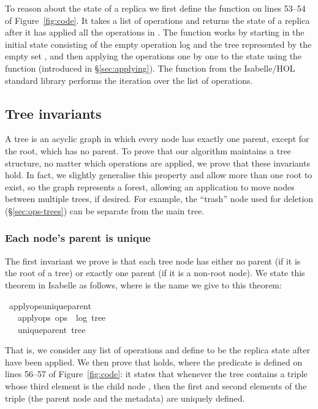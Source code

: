 \documentclass[sigplan,anonymous]{acmart}
\renewenvironment{isabelle}{%
  \medbreak\noindent%
  \renewcommand{\isanewline}{\\}%
  \begin{minipage}{\columnwidth}%
  \begin{isabellebody}%
  \begin{tabbing}%
}{%
  \end{tabbing}%
  \end{isabellebody}%
  \end{minipage}%
  \medbreak%
}
\renewcommand{\isacartoucheopen}{}
\renewcommand{\isacartoucheclose}{}
\begin{document}
To reason about the state of a replica we first define the function  on lines 53--54 of Figure~\ref{fig:code}.
It takes a list of operations  and returns the state of a replica after it has applied all the operations in .
The  function works by starting in the initial state \isa{([], \{\})} consisting of the empty operation log \isa{[]} and the tree represented by the empty set \isa{\{\}}, and then applying the operations one by one to the state using the  function (introduced in \S\ref{sec:applying}).
The  function from the Isabelle/HOL standard library performs the iteration over the list of operations.

\subsection{Tree invariants}\label{sec:tree-invariants}

A tree is an acyclic graph in which every node has exactly one parent, except for the root, which has no parent.
To prove that our algorithm maintains a tree structure, no matter which operations are applied, we prove that these invariants hold.
In fact, we slightly generalise this property and allow more than one root to exist, so the graph represents a forest, allowing an application to move nodes between multiple trees, if desired.
For example, the ``trash'' node used for deletion (\S\ref{sec:ops-trees}) can be separate from the main tree.

\subsubsection{Each node's parent is unique}\label{sec:unique-parent}

The first invariant we prove is that each tree node has either no parent (if it is the root of a tree) or exactly one parent (if it is a non-root node).
We state this theorem in Isabelle as follows, where  is the name we give to this theorem:
\begin{isabelle}
\isamarkupfalse%
\ apply{\isacharunderscore}ops{\isacharunderscore}unique{\isacharunderscore}parent{\isacharcolon}\isanewline
\ \ \ {\isacartoucheopen}apply{\isacharunderscore}ops\ ops\ {\isacharequal}\ {\isacharparenleft}log{\isacharcomma}\ tree{\isacharparenright}{\isacartoucheclose}\isanewline
\ \ \ {\isacartoucheopen}unique{\isacharunderscore}parent\ tree{\isacartoucheclose}
\end{isabelle}
\noindent That is, we consider any list of operations  and define  to be the replica state after  have been applied.
We then prove that  holds, where the  predicate is defined on lines 56--57 of Figure~\ref{fig:code}: it states that whenever the tree contains a triple whose third element is the child node , then the first and second elements of the triple (the parent node and the metadata) are uniquely defined.
\end{document}
